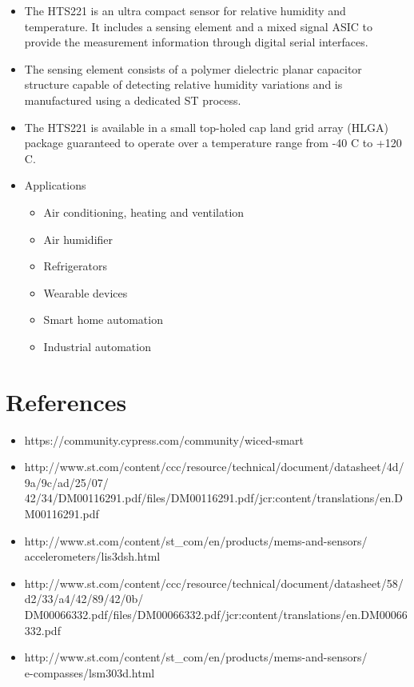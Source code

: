 \documentclass[11pt,a4paper]{article}
\begin{document}
\begin{itemize}
\item The HTS221 is an ultra compact sensor for
relative humidity and temperature. It includes a
sensing element and a mixed signal ASIC to
provide the measurement information through
digital serial interfaces.
\item
The sensing element consists of a polymer
dielectric planar capacitor structure capable of
detecting relative humidity variations and is
manufactured using a dedicated ST process.
\item The HTS221 is available in a small top-holed cap
land grid array (HLGA) package guaranteed to
operate over a temperature range from -40 C to
+120 C.

\item Applications
\begin{itemize}
\item Air conditioning, heating and ventilation
\item Air humidifier
\item Refrigerators
\item Wearable devices 
\item Smart home automation
\item Industrial automation
\end{itemize}
 \end{itemize}





\newpage
	\section{References}
	 \begin{itemize}
	 \item https://community.cypress.com/community/wiced-smart
	 \item http://www.st.com/content/ccc/resource/technical/document/datasheet/4d/9a/9c/ad/25/07/\\42/34/DM00116291.pdf/files/DM00116291.pdf/jcr:content/translations/en.DM00116291.pdf
	 
	 \item http://www.st.com/content/st_com/en/products/mems-and-sensors/\\accelerometers/lis3dsh.html
	 
	 \item http://www.st.com/content/ccc/resource/technical/document/datasheet/58/d2/33/a4/42/89/42/0b/\\DM00066332.pdf/files/DM00066332.pdf/jcr:content/translations/en.DM00066332.pdf
	 \item http://www.st.com/content/st_com/en/products/mems-and-sensors/\\e-compasses/lsm303d.html
	     \end{itemize}
	    
\end{document}
